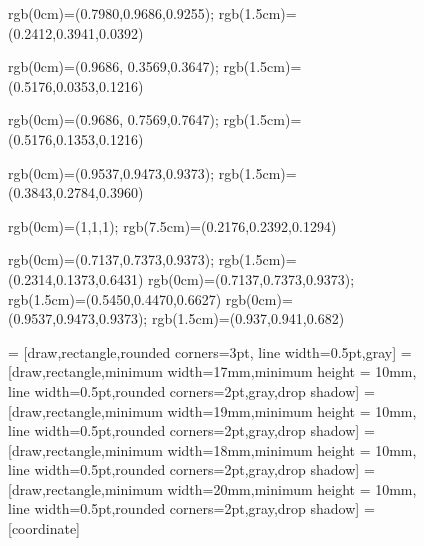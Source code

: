 \documentclass{article}
\begin{document}
\newpage
\begin{figure}[!htb]
    \centering

%
{rgb(0cm)=(0.7980,0.9686,0.9255);
rgb(1.5cm)=(0.2412,0.3941,0.0392)
}

%
{rgb(0cm)=(0.9686, 0.3569,0.3647);
rgb(1.5cm)=(0.5176,0.0353,0.1216)
}

%
{rgb(0cm)=(0.9686, 0.7569,0.7647);
rgb(1.5cm)=(0.5176,0.1353,0.1216)
}

%
{rgb(0cm)=(0.9537,0.9473,0.9373);
rgb(1.5cm)=(0.3843,0.2784,0.3960)
}

%
{rgb(0cm)=(1,1,1);
rgb(7.5cm)=(0.2176,0.2392,0.1294)
}

%
{rgb(0cm)=(0.7137,0.7373,0.9373);
rgb(1.5cm)=(0.2314,0.1373,0.6431)
}
%
{rgb(0cm)=(0.7137,0.7373,0.9373);
rgb(1.5cm)=(0.5450,0.4470,0.6627)
}
%
{rgb(0cm)=(0.9537,0.9473,0.9373);
rgb(1.5cm)=(0.937,0.941,0.682)
}

 = [draw,rectangle,rounded corners=3pt, line width=0.5pt,gray]
 = [draw,rectangle,minimum width=17mm,minimum height = 10mm, line width=0.5pt,rounded corners=2pt,gray,drop shadow]
 = [draw,rectangle,minimum width=19mm,minimum height = 10mm, line width=0.5pt,rounded corners=2pt,gray,drop shadow]
 = [draw,rectangle,minimum width=18mm,minimum height = 10mm, line width=0.5pt,rounded corners=2pt,gray,drop shadow]
 = [draw,rectangle,minimum width=20mm,minimum height = 10mm, line width=0.5pt,rounded corners=2pt,gray,drop shadow]
 = [coordinate]
\end{figure}
\end{document}
